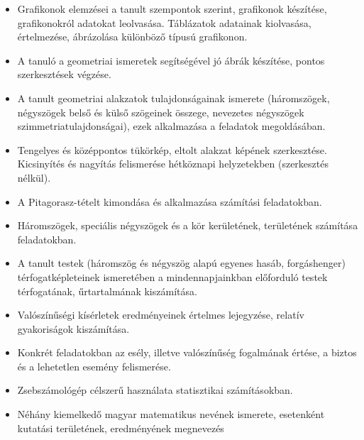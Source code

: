 \begin{itemize}
\item Grafikonok elemzései a tanult szempontok szerint, grafikonok készítése, grafikonokról adatokat leolvasása. Táblázatok adatainak kiolvasása, értelmezése, ábrázolása különböző típusú grafikonon.
\item A tanuló a geometriai ismeretek segítségével jó ábrák készítése, pontos szerkesztések végzése.
\item A tanult geometriai alakzatok tulajdonságainak ismerete (háromszögek, négyszögek belső és külső szögeinek összege, nevezetes négyszögek szimmetriatulajdonságai), ezek alkalmazása a feladatok megoldásában.
\item Tengelyes és középpontos tükörkép, eltolt alakzat képének szerkesztése. Kicsinyítés és nagyítás felismerése hétköznapi helyzetekben (szerkesztés nélkül).
\item A Pitagorasz-tételt kimondása és alkalmazása számítási feladatokban.
\item Háromszögek, speciális négyszögek és a kör kerületének, területének számítása feladatokban.
\item A tanult testek (háromszög és négyszög alapú egyenes hasáb, forgáshenger) térfogatképleteinek ismeretében a mindennapjainkban előforduló testek térfogatának, űrtartalmának kiszámítása.
\item Valószínűségi kísérletek eredményeinek értelmes lejegyzése, relatív gyakoriságok kiszámítása.
\item Konkrét feladatokban az esély, illetve valószínűség fogalmának értése, a biztos és a lehetetlen esemény felismerése.
\item Zsebszámológép célszerű használata statisztikai számításokban.
\item Néhány kiemelkedő magyar matematikus nevének ismerete, esetenként kutatási területének, eredményének megnevezés
\end{itemize}
